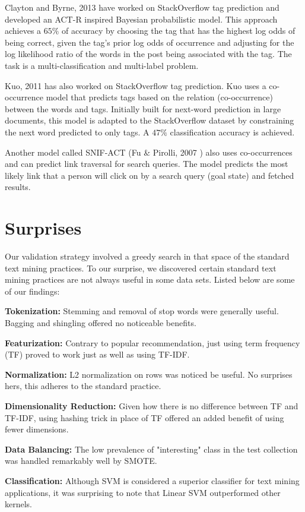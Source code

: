 \documentclass{sig-alternate-05-2015}
\newcommand{\be}{\begin{enumerate*}}
\newcommand{\ee}{\end{enumerate*}}
\begin{document}
Clayton and Byrne, 2013 \cite{stanley2013predicting} have worked on StackOverflow tag prediction and developed an ACT-R inspired Bayesian probabilistic model. This approach achieves a $65\%$ of accuracy by choosing the tag that has the highest log odds of being correct, given the tag's prior log odds of occurrence and adjusting for the log likelihood ratio of the words in the post being associated with the tag. The task is a multi-classification and multi-label problem.

Kuo, 2011 \cite{kuo2011word} has also worked on StackOverflow tag prediction. Kuo uses a co-occurrence model that predicts tags based on the relation (co-occurrence) between the words and tags. Initially built for next-word prediction in large documents, this model is adapted to the StackOverflow dataset by constraining the next word predicted to only tags. A $47\%$ classification accuracy is achieved.

Another model called SNIF-ACT (Fu \& Pirolli, 2007 \cite{fu2007snif}) also uses co-occurrences and can predict link traversal for search queries. The model predicts the most likely link that a person will click on by a search query (goal state) and fetched results. 

\section{Surprises}
\label{sect:Method}
Our validation strategy involved a greedy search in that space of the standard text mining practices. To our surprise, we discovered certain standard text mining practices are not always useful in some data sets. Listed below are some of our findings:
\be
\item \textbf{Tokenization:} Stemming and removal of stop words were generally useful. Bagging and shingling offered no noticeable benefits. 
\item \textbf{Featurization:} Contrary to popular recommendation, just using term frequency (TF) proved to work just as well as using TF-IDF.
\item \textbf{Normalization:} L2 normalization on rows was noticed be useful. No surprises hers, this adheres to the standard practice.
\item \textbf{Dimensionality Reduction:} Given how there is no difference between TF and TF-IDF, using hashing trick in place of TF offered an added benefit of using fewer dimensions.
\item \textbf{Data Balancing:} The low prevalence of "interesting" class in the test collection was handled remarkably well by SMOTE.
\item \textbf{Classification:} Although SVM is considered a superior classifier for text mining applications, it was surprising to note that Linear SVM outperformed other kernels.
\ee
\end{document}
